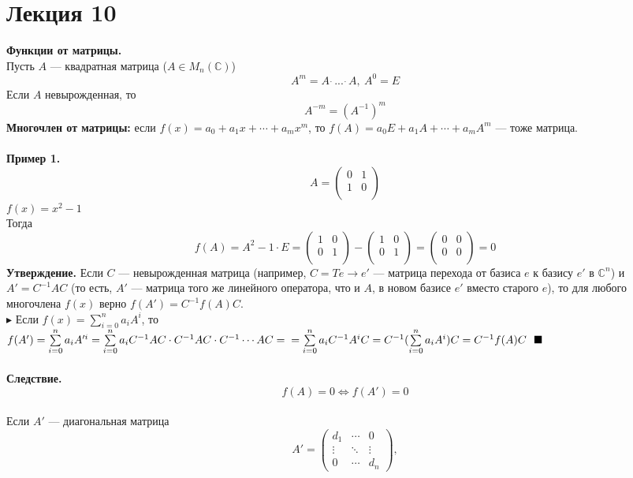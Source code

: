 \documentclass[12pt]{article}
\theoremstyle{definition}
\numberwithin{equation}{section}
\begin{document}
\section *{Лекция 10}
\noindent\textbf{Функции от матрицы.}\\
Пусть $A$ --- квадратная матрица ($A\in M_n(\mathbb{C})$)
$$A^m=A~ \dot~ ... ~\dot~ A,~A^0=E$$
Если $A$ невырожденная, то $$A^{-m}=(A^{-1})^m$$
\textbf{Многочлен от матрицы:} если 
$f(x)=a_0+a_1x+\cdots+a_mx^m$, то
$f(A)=a_0E+a_1A+\cdots +a_mA^m$ --- тоже матрица.\\
\\
\textbf{Пример 1.}\\
\[A = \begin{pmatrix}
0 & 1\\
1 & 0\\
\end{pmatrix}\]
$f(x)=x^2-1$\\
Тогда 
\[f(A)=A^2-1\cdot E = \begin{pmatrix}
1 & 0\\
0 & 1\\
\end{pmatrix} - \begin{pmatrix}
1 & 0\\
0 & 1\\
\end{pmatrix} = \begin{pmatrix}
0 & 0\\
0 & 0\\
\end{pmatrix} =0\]
\textbf{Утверждение.} Если $C$ --- невырожденная матрица (например, $C=Te \to e'$ --- матрица перехода от базиса $e$ к базису $e'$ в $\mathbb{C}^n$) и $A'=C^{-1}AC$ (то есть, $A'$ --- матрица того же линейного оператора, что и $A$, в новом базисе $e'$ вместо старого $e$), то для любого многочлена $f(x)$ верно $f(A')=C^{-1}f(A)C$.\\
$\blacktriangleright$ Если $f(x)=\sum\limits_{i=0}^n a_iA^i$, то $f(A')=\sum\limits_{i=0}^n a_i A'^i=\sum\limits_{i=0}^n a_iC^{-1}AC\cdot C^{-1}AC\cdot C^{-1}\cdots AC=\\=\sum\limits_{i=0}^n a_i C^{-1}A^iC=C^{-1}(\sum\limits_{i=0}^na_iA^i)C=C^{-1}f(A)C~~\blacksquare$\\
\\
\textbf{Следствие.} $$f(A)=0 \Leftrightarrow f(A')=0$$
\\
Если $A'$ --- диагональная матрица\[A'=\begin{pmatrix}
d_1 & \cdots & 0\\
\vdots & \ddots & \vdots\\
0 & \cdots & d_n
\end{pmatrix},\]
\end{document}
